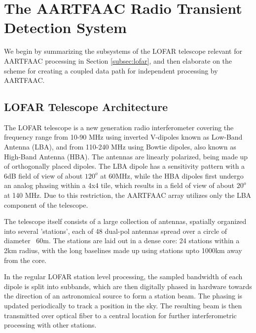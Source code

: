 \documentclass{ws-jai}
\begin{document}
\section {\label{sec:aartfaac_array}The AARTFAAC Radio Transient Detection System}
We  begin by  summarizing the  subsystems of  the LOFAR  telescope relevant  for
AARTFAAC processing  in Section  \ref{subsec:lofar}, and  then elaborate  on the
scheme for creating a coupled data path for independent processing by AARTFAAC.

\subsection {\label{subsec:lofar} LOFAR Telescope Architecture}
The   LOFAR   telescope  \citep{van2013lofar}   is   a   new  generation   radio
interferometer  covering  the frequency  range  from  10-90 MHz  using  inverted
V-dipoles known  as Low-Band Antenna  (LBA), and  from 110-240 MHz  using Bowtie
dipoles,  also known  as High-Band  Antenna  (HBA).  The  antennas are  linearly
polarized, being made  up of orthogonally placed dipoles.  The  LBA dipole has a
sensitivity pattern with  a 6dB field of  view of about $120^o$  at 60MHz, while
the HBA dipoles first undergo an analog phasing within a 4x4 tile, which results
in a  field of view of  about $20^o$ at 140  MHz.  Due to this  restriction, the
AARTFAAC array utilizes only the LBA component of the telescope.

The  telescope itself  consists of  a  large collection  of antennas,  spatially
organized into  several 'stations', each of  48 dual-pol antennas spread  over a
circle of diameter ~60m.  The stations are laid out in a dense core: 24 stations
within a 2km radius, with the long  baselines made up using stations upto 1000km
away from the core.

In the  regular LOFAR station  level processing,  the sampled bandwidth  of each
dipole  is split  into subbands,  which are  then digitally  phased in  hardware
towards the  direction of  an astronomical  source to form  a station  beam. The
phasing is  updated periodically to track  a position in the  sky. The resulting
beam is  then transmitted over optical  fiber to a central  location for further
interferometric processing with other stations.
\end{document}

